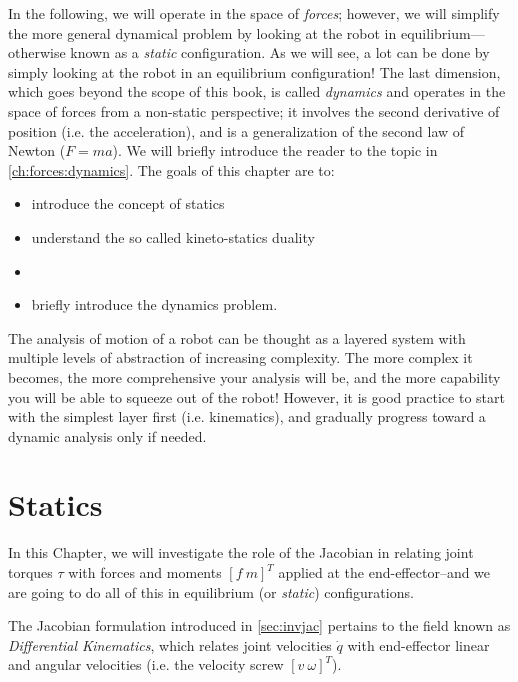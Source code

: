 In the following, we will operate in the space of \textsl{forces}; however, we will simplify the more general dynamical problem by looking at the robot in equilibrium---otherwise known as a \textsl{static} configuration.
As we will see, a lot can be done by simply looking at the robot in an equilibrium configuration!
The last dimension, which goes beyond the scope of this book, is called \textsl{dynamics} and operates in the space of forces from a non-static perspective; it involves the second derivative of position (i.e. the acceleration), and is a generalization of the second law of Newton ($F=ma$).
We will briefly introduce the reader to the topic in \cref{ch:forces:dynamics}.
%
The goals of this chapter are to:

\begin{itemize}
\item introduce the concept of statics
\item understand the so called kineto-statics duality
\item {}
\item briefly introduce the dynamics problem.
\end{itemize}


\begin{mdframed}
\noindent The analysis of motion of a robot can be thought as a layered system with multiple levels of abstraction of increasing complexity.
The more complex it becomes, the more comprehensive your analysis will be, and the more capability you will be able to squeeze out of the robot!
However, it is good practice to start with the simplest layer first (i.e. kinematics), and gradually progress toward a dynamic analysis only if needed.
\end{mdframed}

\section{Statics}

In this Chapter, we will investigate the role of the Jacobian in relating joint torques $\tau$ with forces and moments $[f \ m]^T$ applied at the end-effector--and we are going to do all of this in equilibrium (or \textsl{static}) configurations.


The Jacobian formulation introduced in \cref{sec:invjac} pertains to the field known as \emph{Differential Kinematics}, which relates joint velocities $\dot{q}$ with end-effector linear and angular velocities (i.e. the velocity screw $[v \ \omega]^T$).



